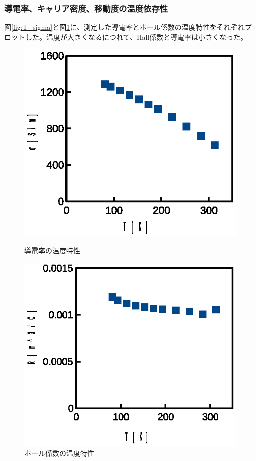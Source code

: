 \documentclass[11pt,a4]{jarticle}
\begin{document}
\subsubsection{導電率、キャリア密度、移動度の温度依存性}
図\ref{fig:T_sigma}と図\ref{fig:T_R}に、測定した導電率とホール係数の温度特性をそれぞれプロットした。温度が大きくなるにつれて、Hall係数と導電率は小さくなった。
\begin{figure}[htbp]
 \begin{minipage}{0.5\hsize}
   \begin{center}
    \includegraphics[width=0.8\hsize]{./T_sigma.eps}
    \caption{導電率の温度特性}
     \label{fig:T_sigma}
   \end{center}
 \end{minipage}
 \begin{minipage}{0.5\hsize}
   \begin{center}
    \includegraphics[width=0.8\hsize]{./T_R.eps}
    \caption{ホール係数の温度特性}
     \label{fig:T_R}
   \end{center}
 \end{minipage}
\end{figure}
\end{document}
